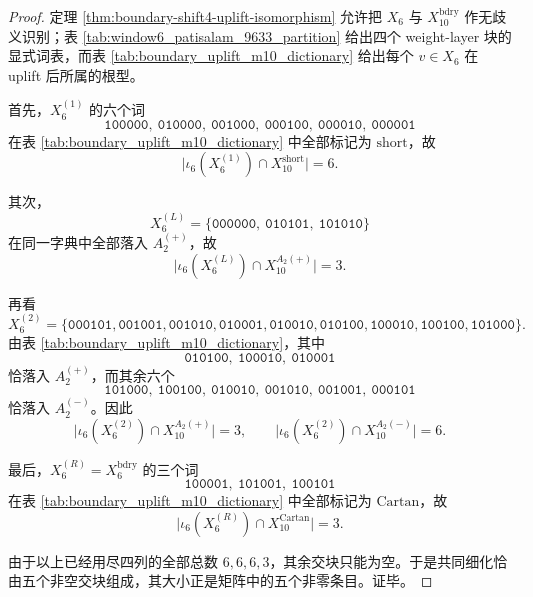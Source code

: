 \begin{proof}
定理 \ref{thm:boundary-shift4-uplift-isomorphism} 允许把 \(X_6\) 与 \(X_{10}^{\mathrm{bdry}}\) 作无歧义识别；表 \ref{tab:window6_patisalam_9633_partition} 给出四个 weight-layer 块的显式词表，而表 \ref{tab:boundary_uplift_m10_dictionary} 给出每个 \(v\in X_6\) 在 uplift 后所属的根型。

首先，\(X_6^{(1)}\) 的六个词
\[
\texttt{100000},\ \texttt{010000},\ \texttt{001000},\ \texttt{000100},\ \texttt{000010},\ \texttt{000001}
\]
在表 \ref{tab:boundary_uplift_m10_dictionary} 中全部标记为 \(\mathrm{short}\)，故
\[
\bigl|\iota_6(X_6^{(1)})\cap X_{10}^{\mathrm{short}}\bigr|=6.
\]

其次，
\[
X_6^{(L)}=\{\texttt{000000},\ \texttt{010101},\ \texttt{101010}\}
\]
在同一字典中全部落入 \(A_2^{(+)}\)，故
\[
\bigl|\iota_6(X_6^{(L)})\cap X_{10}^{A_2(+)}\bigr|=3.
\]

再看
\[
X_6^{(2)}=
\{\texttt{000101},\texttt{001001},\texttt{001010},\texttt{010001},\texttt{010010},\texttt{010100},\texttt{100010},\texttt{100100},\texttt{101000}\}.
\]
由表 \ref{tab:boundary_uplift_m10_dictionary}，其中
\[
\texttt{010100},\ \texttt{100010},\ \texttt{010001}
\]
恰落入 \(A_2^{(+)}\)，而其余六个
\[
\texttt{101000},\ \texttt{100100},\ \texttt{010010},\ \texttt{001010},\ \texttt{001001},\ \texttt{000101}
\]
恰落入 \(A_2^{(-)}\)。因此
\[
\bigl|\iota_6(X_6^{(2)})\cap X_{10}^{A_2(+)}\bigr|=3,
\qquad
\bigl|\iota_6(X_6^{(2)})\cap X_{10}^{A_2(-)}\bigr|=6.
\]

最后，\(X_6^{(R)}=X_6^{\mathrm{bdry}}\) 的三个词
\[
\texttt{100001},\ \texttt{101001},\ \texttt{100101}
\]
在表 \ref{tab:boundary_uplift_m10_dictionary} 中全部标记为 \(\mathrm{Cartan}\)，故
\[
\bigl|\iota_6(X_6^{(R)})\cap X_{10}^{\mathrm{Cartan}}\bigr|=3.
\]

由于以上已经用尽四列的全部总数 \(6,6,6,3\)，其余交块只能为空。于是共同细化恰由五个非空交块组成，其大小正是矩阵中的五个非零条目。证毕。
\end{proof}

